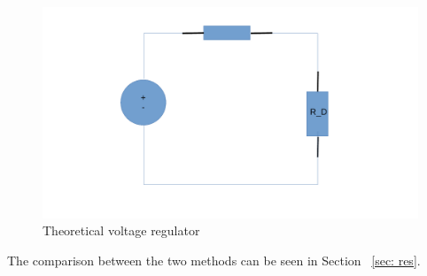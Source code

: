 \begin{figure}[H] \centering
\includegraphics[width=0.8\linewidth]{octave2.pdf}
\caption{Theoretical voltage regulator}
\label{fig:oc2}
\end{figure} 
The comparison between the two methods can be seen in Section ~\ref{sec: res}.
